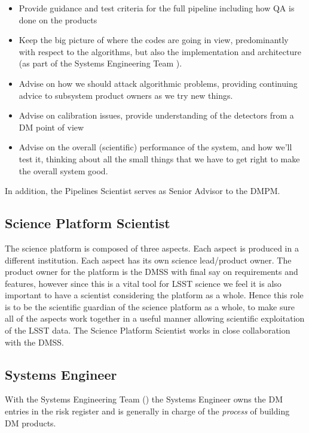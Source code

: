 \begin{itemize}

\item Provide guidance and test criteria for the full \gls{pipeline} including how \gls{QA} is done on the products
\item Keep the big picture of where the codes are going in view, predominantly with respect to the algorithms, but also the implementation and architecture (as part of the \gls{Systems Engineering} Team ).
\item Advise on how we should attack algorithmic problems, providing continuing advice to subsystem product owners as we try new things.
\item Advise on \gls{calibration} issues, provide understanding of the detectors from a \gls{DM} point of view
\item Advise on the overall (scientific) performance of the system, and how we'll test it, thinking about all the small things that we have to get right to make the overall system good.

\end{itemize}

In addition, the Pipelines Scientist serves as Senior Advisor to the \gls{DMPM}.

\subsection{Science Platform Scientist \label{role:scip}}
The science platform is composed of three aspects. Each aspect is produced in a different institution.
Each aspect has its own science lead/product owner.
The product owner for the platform is the \gls{DMSS}  with final say on requirements and features, however since this is a vital tool for \gls{LSST} science we feel it is also important to have a scientist considering the platform as a whole.
Hence this role is to be the scientific guardian of the science platform as a whole, to make sure all of the aspects work together in a useful manner allowing scientific exploitation of the \gls{LSST} data. The \gls{Science Platform} Scientist works in close collaboration with the \gls{DMSS}.

\subsection{Systems Engineer \label{role:sysengineer}}

With the \gls{Systems Engineering} Team () the \gls{Systems Engineer} owns the \gls{DM} entries in the risk register and is generally in charge of the \textit{process} of building \gls{DM} products.

